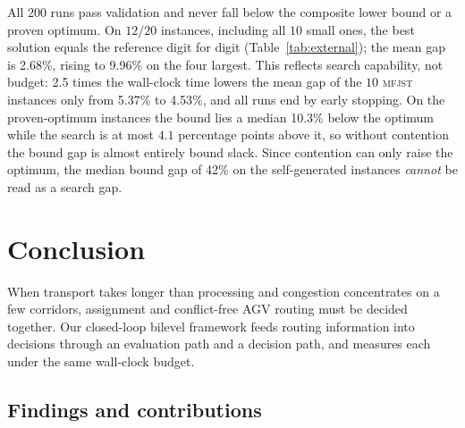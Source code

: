 \documentclass[preprint,review,12pt,authoryear,doubleblind]{elsarticle}
\newcommand{\NSeeds}{10}
\newcommand{\LBGapMed}{42\%}
\newcommand{\PubNInst}{20}
\newcommand{\PubNMatch}{12}               %
\newcommand{\PubGapMean}{2.68\%}          %
\newcommand{\PubGapBig}{9.96\%}           %
\newcommand{\PubBudgetRatio}{2.5}
\newcommand{\PubGapLoBudget}{5.37\%}      %
\newcommand{\PubGapHiBudget}{4.53\%}      %
\newcommand{\PubLBSlack}{10.3\%}          %
\newcommand{\PubLBResidMax}{4.1}          %
\begin{document}
All $200$ runs pass validation and never fall below the composite lower bound or a proven optimum. On $\PubNMatch{}/\PubNInst{}$ instances, including all $10$ small ones, the best solution equals the reference digit for digit (Table~\ref{tab:external}); the mean gap is \PubGapMean{}, rising to \PubGapBig{} on the four largest. This reflects search capability, not budget: \PubBudgetRatio{} times the wall-clock time lowers the mean gap of the $10$ \textsc{mfjst} instances only from \PubGapLoBudget{} to \PubGapHiBudget{}, and all runs end by early stopping. On the proven-optimum instances the bound lies a median \PubLBSlack{} below the optimum while the search is at most $\PubLBResidMax$ percentage points above it, so without contention the bound gap is almost entirely bound slack. Since contention can only raise the optimum, the median bound gap of \LBGapMed{} on the self-generated instances \emph{cannot} be read as a search gap.

\begin{table}[!htbp]
\caption{Degenerate comparison on public benchmarks (exclusivity removed). \textsc{opt}: MILP-proven optimum; \textsc{bk}: best published value; gap from the best of \NSeeds{} seeds; asterisk: identical to the reference.}
\label{tab:external}
\centering
\small

\end{table}



\section{Conclusion}

When transport takes longer than processing and congestion concentrates on a few corridors, assignment and conflict-free AGV routing must be decided together. Our closed-loop bilevel framework feeds routing information into decisions through an evaluation path and a decision path, and measures each under the same wall-clock budget.

\subsection{Findings and contributions}
\label{sec:contributions}
\end{document}
